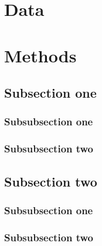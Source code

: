 \documentclass[12pt]{article}
\begin{document}
\newpage
\section{Data}\label{sec:data}

\newpage
\section{Methods}\label{sec:method}


\subsection{Subsection one}\label{sec:subsec1}


\subsubsection{Subsubsection one}\label{sec:subsub1-1}

\subsubsection{Subsubsection two}\label{sec:subsub1-2}


\subsection{Subsection two}\label{sec:subsec2}


\subsubsection{Subsubsection one}\label{sec:subsub2-1}



\subsubsection{Subsubsection two}\label{sec:subsub2-2}
\end{document}

